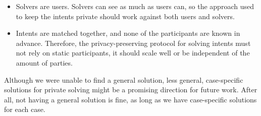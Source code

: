\documentclass[
    9pt,            %
    report,        %
    affiltop,       %
]{art}
\begin{document}
\begin{itemize}
    \item Solvers are users. Solvers can see as much as users can, so the approach used to keep the intents private should work against both users and solvers.
    \item Intents are matched together, and none of the participants are known in advance. Therefore, the privacy-preserving protocol for solving intents must not rely on static participants, it should scale well or be independent of the amount of parties.
\end{itemize}

Although we were unable to find a general solution, less general, case-specific solutions for private solving might be a promising direction for future work. After all, not having a general solution is fine, as long as we have case-specific solutions for each case.



\end{document}
